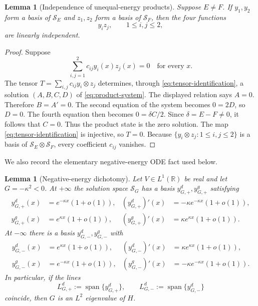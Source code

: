 \documentclass[11pt]{amsart}
\newtheorem{lemma}[theorem]{Lemma}
\numberwithin{equation}{section}
\theoremstyle{remark}
\newcommand{\R}{\mathbb R}
\newcommand{\Sc}{\mathcal S}
\begin{document}
\begin{lemma}[Independence of unequal-energy products]
\label{lem:product-independence}
Suppose $E\ne F$.  If $y_1,y_2$ form a basis of $\Sc_E$ and $z_1,z_2$ form a
basis of $\Sc_F$, then the four functions
\[
 y_i z_j,
 \qquad 1\le i,j\le2,
\]
are linearly independent.
\end{lemma}

\begin{proof}
Suppose
\[
 \sum_{i,j=1}^2c_{ij}y_i(x)z_j(x)=0
 \quad\text{for every }x.
\]
The tensor $T=\sum_{i,j}c_{ij}y_i\otimes z_j$ determines, through
\eqref{eq:tensor-identification}, a solution $(A,B,C,D)$ of
\eqref{eq:product-system}.  The displayed relation says $A=0$.  Therefore
$B=A'=0$.  The second equation of the system becomes $0=2D$, so $D=0$.
The fourth equation then becomes $0=\delta C/2$.  Since
$\delta=E-F\ne0$, it follows that $C=0$.  Thus the product state is the zero
solution.  The map \eqref{eq:tensor-identification} is injective, so $T=0$.
Because $\{y_i\otimes z_j:1\le i,j\le2\}$ is a basis of
$\Sc_E\otimes\Sc_F$, every coefficient $c_{ij}$ vanishes.
\end{proof}

We also record the elementary negative-energy ODE fact used below.

\begin{lemma}[Negative-energy dichotomy]\label{lem:negative-dichotomy}
Let $V\in L^1(\R)$ be real and let $G=-\kappa^2<0$.  At $+\infty$ the
solution space $\Sc_G$ has a basis $y^d_{G,+},y^g_{G,+}$ satisfying
\begin{align*}
 y^d_{G,+}(x)&=e^{-\kappa x}(1+o(1)),
 & (y^d_{G,+})'(x)&=-\kappa e^{-\kappa x}(1+o(1)),\\
 y^g_{G,+}(x)&=e^{\kappa x}(1+o(1)),
 & (y^g_{G,+})'(x)&=\kappa e^{\kappa x}(1+o(1)).
\end{align*}
At $-\infty$ there is a basis $y^d_{G,-},y^g_{G,-}$ with
\begin{align*}
 y^d_{G,-}(x)&=e^{\kappa x}(1+o(1)),
 & (y^d_{G,-})'(x)&=\kappa e^{\kappa x}(1+o(1)),\\
 y^g_{G,-}(x)&=e^{-\kappa x}(1+o(1)),
 & (y^g_{G,-})'(x)&=-\kappa e^{-\kappa x}(1+o(1)).
\end{align*}
In particular, if the lines
\[
 L^d_{G,+}:=\operatorname{span}\{y^d_{G,+}\},
 \qquad
 L^d_{G,-}:=\operatorname{span}\{y^d_{G,-}\}
\]
coincide, then $G$ is an $L^2$ eigenvalue of $H$.
\end{lemma}
\end{document}
